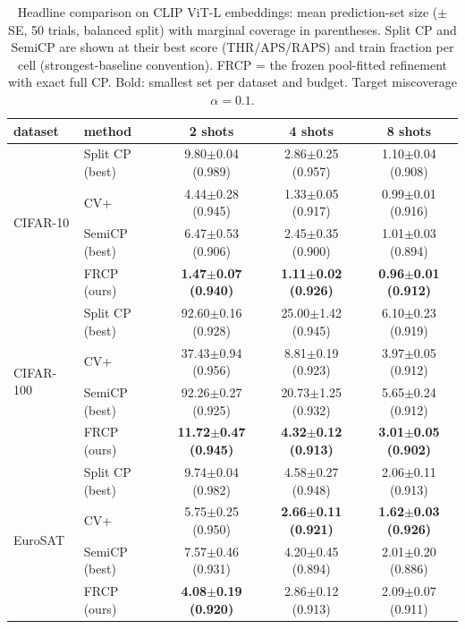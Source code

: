 \begin{table}[t]
\centering
\small
\caption{Headline comparison on CLIP ViT-L embeddings: mean prediction-set size ($\pm$ SE, 50 trials, balanced split) with marginal coverage in parentheses. Split CP and SemiCP are shown at their best score (THR/APS/RAPS) and train fraction per cell (strongest-baseline convention). FRCP = the frozen pool-fitted refinement with exact full CP. Bold: smallest set per dataset and budget. Target miscoverage $\alpha=0.1$.}
\label{tab:headline-clipl}
\begin{tabular}{llccc}
\toprule
dataset & method & 2 shots & 4 shots & 8 shots\\
\midrule
\multirow{4}{*}{CIFAR-10} & Split CP (best) & 9.80$\pm$0.04 {\scriptsize(0.989)} & 2.86$\pm$0.25 {\scriptsize(0.957)} & 1.10$\pm$0.04 {\scriptsize(0.908)}\\
 & CV+ & 4.44$\pm$0.28 {\scriptsize(0.945)} & 1.33$\pm$0.05 {\scriptsize(0.917)} & 0.99$\pm$0.01 {\scriptsize(0.916)}\\
 & SemiCP (best) & 6.47$\pm$0.53 {\scriptsize(0.906)} & 2.45$\pm$0.35 {\scriptsize(0.900)} & 1.01$\pm$0.03 {\scriptsize(0.894)}\\
 & FRCP (ours) & \textbf{1.47$\pm$0.07 {\scriptsize(0.940)}} & \textbf{1.11$\pm$0.02 {\scriptsize(0.926)}} & \textbf{0.96$\pm$0.01 {\scriptsize(0.912)}}\\
\midrule
\multirow{4}{*}{CIFAR-100} & Split CP (best) & 92.60$\pm$0.16 {\scriptsize(0.928)} & 25.00$\pm$1.42 {\scriptsize(0.945)} & 6.10$\pm$0.23 {\scriptsize(0.919)}\\
 & CV+ & 37.43$\pm$0.94 {\scriptsize(0.956)} & 8.81$\pm$0.19 {\scriptsize(0.923)} & 3.97$\pm$0.05 {\scriptsize(0.912)}\\
 & SemiCP (best) & 92.26$\pm$0.27 {\scriptsize(0.925)} & 20.73$\pm$1.25 {\scriptsize(0.932)} & 5.65$\pm$0.24 {\scriptsize(0.912)}\\
 & FRCP (ours) & \textbf{11.72$\pm$0.47 {\scriptsize(0.945)}} & \textbf{4.32$\pm$0.12 {\scriptsize(0.913)}} & \textbf{3.01$\pm$0.05 {\scriptsize(0.902)}}\\
\midrule
\multirow{4}{*}{EuroSAT} & Split CP (best) & 9.74$\pm$0.04 {\scriptsize(0.982)} & 4.58$\pm$0.27 {\scriptsize(0.948)} & 2.06$\pm$0.11 {\scriptsize(0.913)}\\
 & CV+ & 5.75$\pm$0.25 {\scriptsize(0.950)} & \textbf{2.66$\pm$0.11 {\scriptsize(0.921)}} & \textbf{1.62$\pm$0.03 {\scriptsize(0.926)}}\\
 & SemiCP (best) & 7.57$\pm$0.46 {\scriptsize(0.931)} & 4.20$\pm$0.45 {\scriptsize(0.894)} & 2.01$\pm$0.20 {\scriptsize(0.886)}\\
 & FRCP (ours) & \textbf{4.08$\pm$0.19 {\scriptsize(0.920)}} & 2.86$\pm$0.12 {\scriptsize(0.913)} & 2.09$\pm$0.07 {\scriptsize(0.911)}\\
\bottomrule
\end{tabular}
\end{table}
